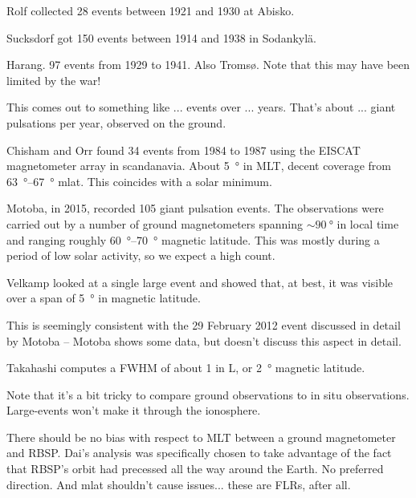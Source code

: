 Rolf\cite{rolf_1931} collected 28 events between 1921 and 1930 at Abisko. 

Sucksdorf\cite{sucksdorff_1939} got 150 events between 1914 and 1938 in Sodankyl{\"a}. 

Harang\cite{harang_1941}. 97 events from 1929 to 1941. Also Troms{\o}. Note that this may have been limited by the war! 

This comes out to something like ... events over ... years. That's about ... giant pulsations per year, observed on the ground. 


Chisham and Orr\cite{chisham_1991} found 34 events from 1984 to 1987 using the EISCAT magnetometer array in scandanavia. About \SI{5}{\degree} in MLT, decent coverage from \SIrange{63}{67}{\degree} mlat. This coincides with a solar minimum. 

Motoba, in 2015, recorded 105 giant pulsation events. The observations were carried out by a number of ground magnetometers spanning $\sim \SI{90}{\degree}$ in local time and ranging roughly \SIrange{60}{70}{\degree} magnetic latitude\cite{motoba_2015}. This was mostly during a period of low solar activity, so we expect a high count. 


Velkamp\cite{veldkamp_1960} looked at a single large event and showed that, at best, it was visible over a span of \SI{5}{\degree} in magnetic latitude. 

This is seemingly consistent with the 29 February 2012 event discussed in detail by Motoba\cite{motoba_2015} -- Motoba shows some data, but doesn't discuss this aspect in detail. 

Takahashi\cite{takahashi_2011} computes a FWHM of about 1 in L, or \SI{2}{\degree} magnetic latitude. 


Note that it's a bit tricky to compare ground observations to in situ observations. Large-\azm events won't make it through the ionosphere. 

There should be no bias with respect to MLT between a ground magnetometer and RBSP. Dai's analysis was specifically chosen to take advantage of the fact that RBSP's orbit had precessed all the way around the Earth. No preferred direction. And mlat shouldn't cause issues... these are FLRs, after all. 

